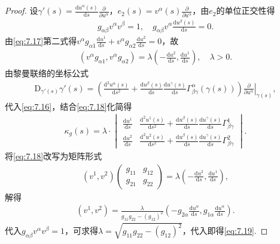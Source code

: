 \documentclass[../../main.tex]{subfiles}%
\begin{document}
\begin{proof}
设$\gamma'(s)=\frac{\mathrm{d}u^\alpha(s)}{\mathrm{d}s}\frac{\partial}{\partial u^\alpha}$，$e_2(s)=v^\alpha(s)\frac{\partial}{\partial u^\alpha}$，由$e_2$的单位正交性得
\begin{align}
g_{\alpha\beta}v^\alpha v^\beta=1,\quad g_{\alpha\beta}v^\alpha\frac{\mathrm{d}u^\beta(s)}{\mathrm{d}s}=0.\label{eq:7.17}
\end{align}
由\eqref{eq:7.17}第二式得$v^\alpha g_{\alpha1}\frac{\mathrm{d}u^1}{\mathrm{d}s}+v^\alpha g_{\alpha2}\frac{\mathrm{d}u^2}{\mathrm{d}s}=0$，故
\begin{align}
\left(v^\alpha g_{\alpha1},v^\alpha g_{\alpha2}\right)=\lambda\left(-\frac{\mathrm{d}u^2}{\mathrm{d}s},\frac{\mathrm{d}u^1}{\mathrm{d}s}\right),\quad \lambda>0.\label{eq:7.18}
\end{align}
由黎曼联络的坐标公式
\begin{align*}
\mathrm{D}_{\gamma'(s)}\gamma'(s)=\left(\frac{\mathrm{d}^2u^\alpha(s)}{\mathrm{d}s^2}+\frac{\mathrm{d}u^\beta(s)}{\mathrm{d}s}\frac{\mathrm{d}u^\gamma(s)}{\mathrm{d}s}\Gamma^\alpha_{\beta\gamma}(\gamma(s))\right)\left.\frac{\partial}{\partial u^\alpha}\right|_{\gamma(s)},
\end{align*}
代入\eqref{eq:7.16}，结合\eqref{eq:7.18}化简得
\begin{align*}
\kappa_g(s)=\lambda\cdot
\begin{vmatrix}
\frac{\mathrm{d}u^1}{\mathrm{d}s} & \frac{\mathrm{d}^2u^1(s)}{\mathrm{d}s^2}+\frac{\mathrm{d}u^\beta(s)}{\mathrm{d}s}\frac{\mathrm{d}u^\gamma(s)}{\mathrm{d}s}\Gamma^1_{\beta\gamma} \\
\frac{\mathrm{d}u^2}{\mathrm{d}s} & \frac{\mathrm{d}^2u^2(s)}{\mathrm{d}s^2}+\frac{\mathrm{d}u^\beta(s)}{\mathrm{d}s}\frac{\mathrm{d}u^\gamma(s)}{\mathrm{d}s}\Gamma^2_{\beta\gamma}
\end{vmatrix}.
\end{align*}
将\eqref{eq:7.18}改写为矩阵形式
\begin{align*}
\left(v^1,v^2\right)\begin{pmatrix}g_{11}&g_{12}\\g_{21}&g_{22}\end{pmatrix}=\lambda\left(-\frac{\mathrm{d}u^2}{\mathrm{d}s},\frac{\mathrm{d}u^1}{\mathrm{d}s}\right),
\end{align*}
解得
\begin{align*}
\left(v^1,v^2\right)=\frac{\lambda}{g_{11}g_{22}-(g_{12})^2}\left(-g_{2\alpha}\frac{\mathrm{d}u^\alpha}{\mathrm{d}s},g_{1\alpha}\frac{\mathrm{d}u^\alpha}{\mathrm{d}s}\right).
\end{align*}
代入$g_{\alpha\beta}v^\alpha v^\beta=1$，可求得$\lambda=\sqrt{g_{11}g_{22}-(g_{12})^2}$，代入即得\eqref{eq:7.19}.
\end{proof}
\end{document}

